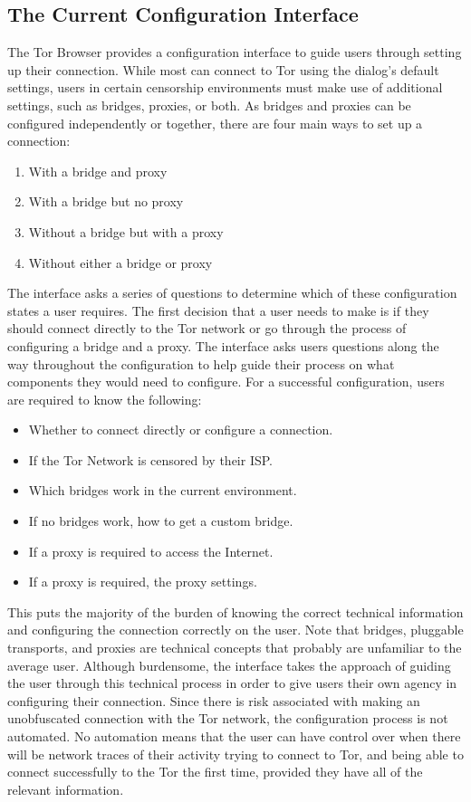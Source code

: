 \documentclass{template}
\begin{document}
\subsection{The Current Configuration Interface} 
The Tor Browser provides a configuration interface to guide users through setting up 
their connection. While most can connect to Tor using the
dialog's default settings, users in certain censorship environments must
make use of additional settings, such as bridges, proxies, or both. As bridges and proxies can be configured independently or together, there are
four main ways to set up a connection:

\begin{enumerate} \itemsep1pt \parskip0pt 
    \item With a bridge and proxy
    \item With a bridge but no proxy
    \item Without a bridge but with a proxy
    \item Without either a bridge or proxy
\end{enumerate}

The interface asks a series of questions to determine which of these configuration states a user requires. The first decision that a user needs to make is if they should connect directly to the Tor network or go through the process of  configuring a bridge and a proxy. The interface asks users questions along the way throughout the configuration to help guide their process on what components they would need to configure. For a successful configuration, users are required to know the following: 

\begin{itemize} \itemsep1pt \parskip0pt 
	\item{Whether to connect directly or configure a connection.} 
	\item{If the Tor Network is censored by their ISP.}
	\item{Which bridges work in the current environment.} 
	\item{If no bridges work, how to get a custom bridge.} 
	\item{If a proxy is required to access the Internet.}
	\item{If a proxy is required, the proxy settings.}
\end{itemize}

This puts the majority of the burden of knowing the correct technical information and configuring the connection correctly on the user. Note that bridges, pluggable transports, and proxies are technical concepts that probably are unfamiliar to the average user. Although burdensome, the interface takes the approach of guiding the user through this technical process in order to give users their own agency in configuring their connection. Since there is risk associated with making an unobfuscated connection with the Tor network, the configuration process is not automated. No automation means that the user can have control over when there will be network traces of their activity trying to connect to Tor, and being able to connect successfully to the Tor the first time, provided they have all of the relevant information. 
\end{document}
